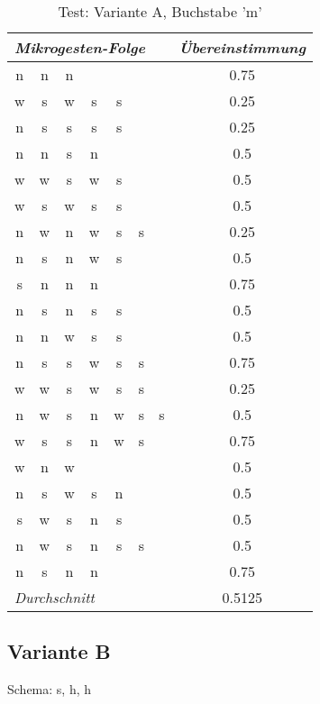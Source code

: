 \begin{table}[!h]
  \begin{center}
    \begin{tabular}{ c c c c c c c  | c }
\multicolumn{7}{l}{\emph{Mikrogesten-Folge}}&\emph{Übereinstimmung} \\ \hline
n&n&n&&&&&0.75\\ \hline
w&s&w&s&s&&&0.25\\ \hline
n&s&s&s&s&&&0.25\\ \hline
n&n&s&n&&&&0.5\\ \hline
w&w&s&w&s&&&0.5\\ \hline
w&s&w&s&s&&&0.5\\ \hline
n&w&n&w&s&s&&0.25\\ \hline
n&s&n&w&s&&&0.5\\ \hline
s&n&n&n&&&&0.75\\ \hline
n&s&n&s&s&&&0.5\\ \hline
n&n&w&s&s&&&0.5\\ \hline
n&s&s&w&s&s&&0.75\\ \hline
w&w&s&w&s&s&&0.25\\ \hline
n&w&s&n&w&s&s&0.5\\ \hline
w&s&s&n&w&s&&0.75\\ \hline
w&n&w&&&&&0.5\\ \hline
n&s&w&s&n&&&0.5\\ \hline
s&w&s&n&s&&&0.5\\ \hline
n&w&s&n&s&s&&0.5\\ \hline
n&s&n&n&&&&0.75\\ \hline
\multicolumn{7}{l|}{\emph{Durchschnitt}}&  0.5125  \\ \hline

    \end{tabular}
  \end{center}
  \caption{Test: Variante A, Buchstabe 'm'}
  \label{test_a_m}
\end{table}

\subsection{Variante B}

Schema: s, h, h

